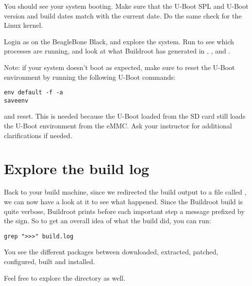 You should see your system booting. Make sure that the U-Boot SPL and
U-Boot version and build dates match with the current date. Do the
same check for the Linux kernel.

Login as  on the BeagleBone Black, and explore the
system. Run  to see which processes are running, and look at
what Buildroot has generated in , , 
and .

Note: if your system doesn't boot as expected, make sure to reset the
U-Boot environment by running the following U-Boot commands:

\begin{verbatim}
env default -f -a
saveenv
\end{verbatim}

and reset. This is needed because the U-Boot loaded from the SD card
still loads the U-Boot environment from the eMMC. Ask your instructor
for additional clarifications if needed.

\section{Explore the build log}

Back to your build machine, since we redirected the build output to a
file called , we can now have a look at it to see what
happened. Since the Buildroot build is quite verbose, Buildroot prints
before each important step a message prefixed by the \code{>>>}
sign. So to get an overall idea of what the build did, you can run:

\begin{verbatim}
grep ">>>" build.log
\end{verbatim}

You see the different packages between downloaded, extracted, patched,
configured, built and installed.

Feel free to explore the  directory as well.
